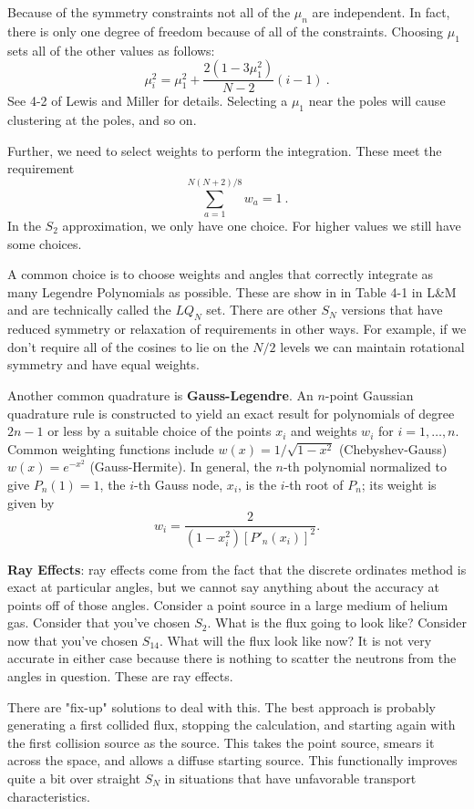\documentclass[12pt]{article}
\begin{document}
Because of the symmetry constraints not all of the $\mu_n$ are independent. In fact, there is only one degree of freedom because of all of the constraints. Choosing $\mu_1$ sets all of the other values as follows:
\[
\mu_i^2 = \mu_1^2 + \frac{2(1 - 3\mu_1^2)}{N-2}(i-1)\:.
\]
See 4-2 of Lewis and Miller for details. Selecting a $\mu_1$ near the poles will cause clustering at the poles, and so on. 

Further, we need to select weights to perform the integration. These meet the requirement
\[
\sum_{a=1}^{N(N+2)/8} w_a = 1\:.
\]
In the $S_2$ approximation, we only have one choice. For higher values we still have some choices. 

A common choice is to choose weights and angles that correctly integrate as many Legendre Polynomials as possible. These are show in in Table 4-1 in L\&M and are technically called the $LQ_N$ set. There are other $S_N$ versions that have reduced symmetry or relaxation of requirements in other ways. For example, if we don't require all of the cosines to lie on the $N/2$ levels we can maintain rotational symmetry and have equal weights. 

Another common quadrature is \textbf{Gauss-Legendre}. An $n$-point Gaussian quadrature rule is constructed to yield an exact result for polynomials of degree $2n - 1$ or less by a suitable choice of the points $x_i$ and weights $w_i$ for $i = 1, \dots, n$. Common weighting functions include $w(x)= 1/\sqrt{1-x^2}$ (Chebyshev-Gauss) $w(x)=e^{-x^{2}}$ (Gauss-Hermite).
In general, the $n$-th polynomial normalized to give $P_n(1) = 1$, the $i$-th Gauss node, $x_i$, is the $i$-th root of $P_n$; its weight is given by
\[ 
w_{i}={\frac {2}{\left(1-x_{i}^{2}\right)[P'_{n}(x_{i})]^{2}}}.
\]
    
    
\textbf{Ray Effects}: ray effects come from the fact that the discrete ordinates method is exact at particular angles, but we cannot say anything about the accuracy at points off of those angles. Consider a point source in a large medium of helium gas. Consider that you've chosen $S_2$. What is the flux going to look like? Consider now that you've chosen $S_14$. What will the flux look like now? It is not very accurate in either case because there is nothing to scatter the neutrons from the angles in question. These are ray effects. 

There are "fix-up" solutions to deal with this. The best approach is probably generating a first collided flux, stopping the calculation, and starting again with the first collision source as the source. This takes the point source, smears it across the space, and allows a diffuse starting source. This functionally improves quite a bit over straight $S_N$ in situations that have unfavorable transport characteristics.
\end{document}
